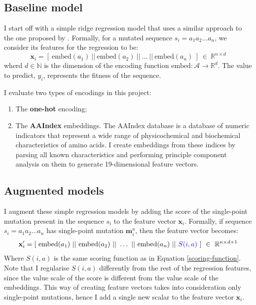 \subsection{Baseline model} 
I start off with a simple ridge regression model that uses a similar approach to the one proposed by \citet{chloe-hsu}. Formally, for a mutated sequence $s_i = a_1a_2\dots a_n$, we consider its features for the regression to be:
\begin{equation}
    \mathbf{x}_i = [~\text{embed}(a_1) ~||~ \text{embed}(a_2) ~||~ \dots ~||~\text{embed}(a_n)~] ~\in~\mathbb{R}^{n \times d} 
\label{baseline-regression}
\end{equation}
wherd $d\in\mathbb{N}$ is the dimension of the encoding function $\text{embed}:\mathcal{A}\rightarrow \mathbb{R}^d$. The value to predict, $y_i$, represents the fitness of the sequence.

I evaluate two types of encodings in this project:
\begin{enumerate}
    \item The \textbf{one-hot} encoding;
    \item The \textbf{AAIndex} embeddings. The AAIndex database \cite{aa-index} is a database of numeric indicators that represent a wide range of physicochemical and biochemical characteristics of amino acids. I create embeddings from these indices by parsing all known characteristics and performing principle component analysis on them to generate 19-dimensional feature vectors. 
\end{enumerate}

\subsection{Augmented models} 
I augment these simple regression models by adding the score of the single-point mutation present in the sequence $s_i$ to the feature vector $\mathbf{x}_i$. Formally, if sequence $s_i = a_1a_2\dots a_n$ has single-point mutation $\mathbf{m}_i^a$, then the feature vector becomes:
\begin{equation}
    \mathbf{x}_i' = [~\text{embed}(a_1) ~||~ \text{embed}(a_2) ~||~ \dots ~||~ \text{embed}(a_n) ~||~ {\color{blue} S(i, a)}~] ~\in~\mathbb{R}^{n\times d + 1}
\label{augmented-regression}
\end{equation}
Where $S(i, a)$ is the same scoring function as in Equation \ref{scoring-function}. Note that I regularise $S(i,a)$  differently from the rest of the regression features, since the value scale of the score is different from the value scale of the embeddings. This way of creating feature vectors takes into consideration only single-point mutations, hence I add a single new scalar to the feature vector $\mathbf{x}_i$. 

